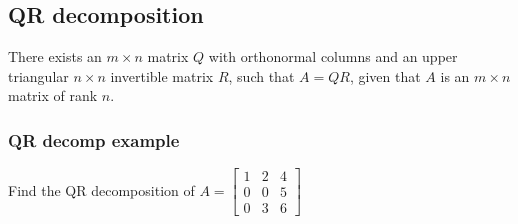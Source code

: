 \begin{enumerate}
\subsection{QR decomposition}
There exists an $m \times n$ matrix $Q$ with orthonormal columns and an upper triangular $n \times n$ invertible matrix $R$, such that $A = QR$, given that $A$ is an $m \times n$ matrix of rank $n$.
\subsubsection{QR decomp example}
Find the QR decomposition of $A = \begin{bmatrix} 1 & 2 & 4 \\ 
0 & 0 & 5 \\ 0 & 3 & 6 \end{bmatrix}$ 
\end{enumerate}
